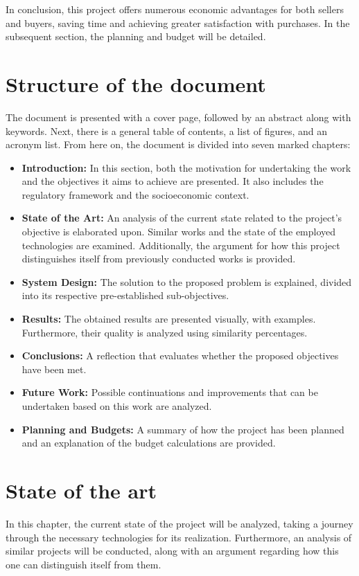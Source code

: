 \documentclass[12pt]{report} %
\begin{document}
In conclusion, this project offers numerous economic advantages for both sellers and buyers, saving time and achieving greater satisfaction with purchases. In the subsequent section, the planning and budget will be detailed.

\section*{Structure of the document}

The document is presented with a cover page, followed by an abstract along with keywords. Next, there is a general table of contents, a list of figures, and an acronym list. From here on, the document is divided into seven marked chapters:

\begin{itemize}
	\item \textbf{Introduction:} In this section, both the motivation for undertaking the work and the objectives it aims to achieve are presented. It also includes the regulatory framework and the socioeconomic context.
	\item \textbf{State of the Art:} An analysis of the current state related to the project's objective is elaborated upon. Similar works and the state of the employed technologies are examined. Additionally, the argument for how this project distinguishes itself from previously conducted works is provided.
	\item \textbf{System Design:} The solution to the proposed problem is explained, divided into its respective pre-established sub-objectives.
	\item \textbf{Results:} The obtained results are presented visually, with examples. Furthermore, their quality is analyzed using similarity percentages.
	\item \textbf{Conclusions:} A reflection that evaluates whether the proposed objectives have been met.
	\item \textbf{Future Work:} Possible continuations and improvements that can be undertaken based on this work are analyzed.
	\item \textbf{Planning and Budgets:} A summary of how the project has been planned and an explanation of the budget calculations are provided.
\end{itemize}

\section*{State of the art}
In this chapter, the current state of the project will be analyzed, taking a journey through the necessary technologies for its realization. Furthermore, an analysis of similar projects will be conducted, along with an argument regarding how this one can distinguish itself from them.
\end{document}
